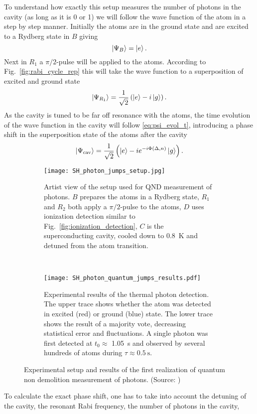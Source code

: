 To understand how exactly this setup measures the number of photons in the
cavity (as long as it is 0 or 1) we will follow the wave function of the atom in
a step by step manner. Initially the atoms are in the ground state and are
excited to a Rydberg state in $B$ giving
$$ \ket{\Psi_B} = \ket{e}.  $$
Next in $R_1$ a $\pi/2$-pulse will be applied to the atoms. According to
Fig.~\ref{fig:rabi_cycle_rep} this will take the wave function to a
superposition of excited and ground state
$$ \ket{\Psi_{R_1}} = \frac{1}{\sqrt{2}} \left( \ket{e} - i\ket{g}\right).  $$
As the cavity is tuned to be far off resonance with the atoms, the time
evolution of the wave function in the cavity will follow \eqref{eq:psi_evol_t},
introducing a phase shift in the superposition state of the atoms after the
cavity
$$ \ket{\Psi_{\text{cav}}} = \frac{1}{\sqrt{2}} \left(\ket{e} -i
e^{-i\Phi(\Delta,n)} \ket{g} \right).$$
\begin{figure}[t]
  \centering
  \begin{subfigure}[t]{.48\linewidth}
    \centering
    \texttt{[image: SH\_photon\_jumps\_setup.jpg]}
    \caption{Artist view of the setup used for QND measurement of photons. $B$
    prepares the atoms in a Rydberg state, $R_1$ and $R_2$ both apply a
    $\pi/2$-pulse to the atoms, $D$ uses ionization detection similar to
    Fig.~\ref{fig:ionization_detection}, $C$ is the superconducting cavity,
    cooled down to \SI{0.8}{\kelvin} and detuned
    from the atom transition.}
    \label{fig:QND_setup}
  \end{subfigure}
  ~
  \begin{subfigure}[t]{.48\linewidth}
    \centering
    \texttt{[image: SH\_photon\_quantum\_jumps\_results.pdf]}
    \caption{Experimental results of the thermal photon detection. The upper
    trace shows whether the atom was detected in excited (red) or ground (blue)
    state. The lower trace shows the result of a majority vote, decreasing
    statistical error and fluctuations. A single photon was first detected at $t_0
    \approx$ \SI{1.05}{\second} and observed by several hundreds of atoms during
    $\tau \approx \SI{0.5}{\second}$.}
    \label{fig:quantum_jumps_results}
  \end{subfigure}
  \caption{Experimental setup and results of the first realization of quantum
  non demolition measurement of photons. (Source: \cite{gleyzes2007quantum})}
\end{figure}
To calculate the exact phase shift, one has to take into account the detuning of
the cavity, the resonant Rabi frequency, the number of photons in the cavity,
